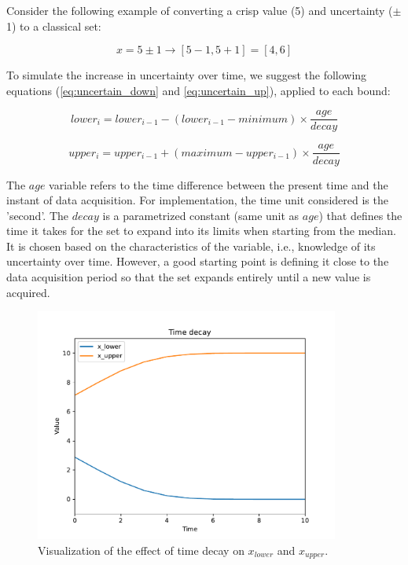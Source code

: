 Consider the following example of converting a crisp value (5) and uncertainty ($\pm$1) to a classical set:

$$x = 5 \pm 1 \rightarrow [5-1, 5+1] = [4, 6]$$

To simulate the increase in uncertainty over time, we suggest the following equations (\ref{eq:uncertain_down} and \ref{eq:uncertain_up}), applied to each bound:

\begin{equation} \label{eq:uncertain_down}
lower_{i} = lower_{i-1} - (lower_{i-1} - minimum) \times \frac{age}{decay}
\end{equation}

\begin{equation} \label{eq:uncertain_up}
upper_{i} = upper_{i-1} + (maximum - upper_{i-1}) \times \frac{age}{decay}
\end{equation}

The $age$ variable refers to the time difference between the present time and the instant of data acquisition. For implementation, the time unit considered is the 'second'. The $decay$ is a parametrized constant (same unit as $age$) that defines the time it takes for the set to expand into its limits when starting from the median. It is chosen based on the characteristics of the variable, i.e., knowledge of its uncertainty over time. However, a good starting point is defining it close to the data acquisition period so that the set expands entirely until a new value is acquired.

\begin{figure}[h!]
    \centering
    \includegraphics[width=10cm]{figures/chapter4/cell/time_decay.pdf}
    \caption{Visualization of the effect of time decay on $x_{lower}$ and $x_{upper}$.}
    \label{fig:timedecay}
\end{figure}

